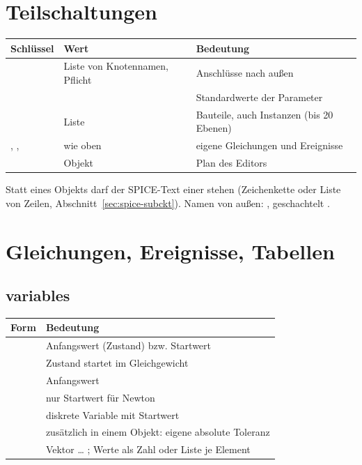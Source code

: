 \section{Teilschaltungen}
\label{sec:ref-teil}

\begin{longtable}{@{}P{3.0cm}P{4.3cm}P{6.5cm}@{}}
  \toprule
  Schlüssel & Wert & Bedeutung \\
  \midrule
  \endhead
  \bottomrule
  \endfoot
   & Liste von Knotennamen, Pflicht & Anschlüsse nach außen \\
   &  & Standardwerte der Parameter \\
   & Liste & Bauteile, auch Instanzen (bis 20 Ebenen) \\
  , ,  & wie oben & eigene Gleichungen und Ereignisse \\
   & Objekt & Plan des Editors \\
\end{longtable}

Statt eines Objekts darf der SPICE-Text einer  stehen
(Zeichenkette oder Liste von Zeilen, Abschnitt~\ref{sec:spice-subckt}).
Namen von außen: , geschachtelt
.

\section{Gleichungen, Ereignisse, Tabellen}
\label{sec:ref-gleichungen}

\subsection*{variables}

\begin{longtable}{@{}P{4.6cm}P{9.2cm}@{}}
  \toprule
  Form & Bedeutung \\
  \midrule
  \endhead
  \bottomrule
  \endfoot
   & Anfangswert (Zustand) bzw. Startwert \\
   & Zustand startet im Gleichgewicht \\
   & Anfangswert \\
   & nur Startwert für Newton \\
   & diskrete Variable mit Startwert \\
   & zusätzlich in einem Objekt: eigene absolute Toleranz \\
   & Vektor  … ; Werte als Zahl oder Liste je Element \\
\end{longtable}

